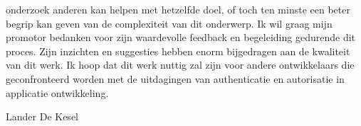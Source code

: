 onderzoek anderen kan helpen met hetzelfde doel, of toch ten minste een beter begrip kan geven van de complexiteit van dit onderwerp.
\newline
\newline
Ik wil graag mijn promotor bedanken voor zijn waardevolle feedback en begeleiding gedurende dit proces. Zijn inzichten en suggesties hebben enorm bijgedragen aan de kwaliteit van dit werk. 
\newline
\newline
Ik hoop dat dit werk nuttig zal zijn voor andere ontwikkelaars die geconfronteerd worden met de uitdagingen van authenticatie en autorisatie in applicatie ontwikkeling.

\begin{flushright}
Lander De Kesel
\end{flushright}